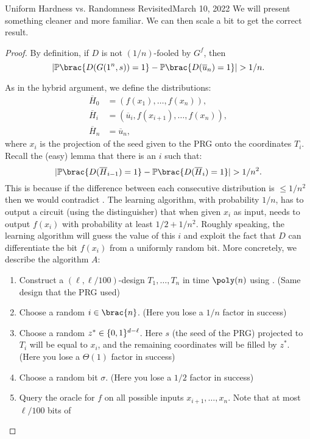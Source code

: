 \begin{lecture}{8}{Uniform Hardness vs. Randomness Revisited}{March 10, 2022}
We will present something cleaner and more familiar. We can then scale a bit to get the correct result.

\begin{proof}
	By definition, if $D$ is not $(1/n)$-fooled by $G^f$, then
	\begin{equation}\label{eq:dist-NW-prg}
		\card{\Pr\brac{D(G(1^n, s)) = 1} - \Pr\brac{D(\overline{u}_n) = 1}} > 1/n.
	\end{equation}
	
	As in the hybrid argument, we define the distributions:
	\begin{align*}
		\overline{H}_0 &= (f(x_1), \ldots, f(x_n)),\\
		\overline{H}_i &= (\overline{u}_i, f(x_{i + 1}), \ldots, f(x_n)),\\
		\overline{H}_n &= \overline{u}_n,
	\end{align*}
	where $x_i$ is the projection of the seed given to the PRG onto the
	coordinates $T_i$. Recall the (easy) lemma that there is an $i$ such that:
	\[
	\card{\Pr\brac{D(\overline{H}_{i - 1}) = 1} - \Pr\brac{D(\overline{H}_i) = 1}} > 1 / n^2.
	\]
	This is because if the difference between each consecutive distribution is $\leq 1/n^2$ then we would contradict .
	The learning algorithm, with probability $1/n$, has to output a circuit (using the distinguisher) that when given $x_i$ as input, needs to output $f(x_i)$ with probability at least $1/2 + 1/n^2$.
	Roughly speaking, the learning algorithm will guess the value of this $i$ and
	exploit the fact that $D$ can differentiate the bit $f(x_i)$ from a uniformly
	random bit. More concretely, we describe the algorithm $A$:
	\begin{enumerate}
		\item Construct a $(\ell, \ell/100)$-design $T_1, \dots, T_n$ in
		time $\poly(n)$ using . (Same design that the PRG used)
		\item Choose a random $i \in \brac{n}$. (Here you lose a $1/n$ factor in success)
		\item Choose a random $z^* \in \{0, 1\}^{d - \ell}$. Here $s$
		(the seed of the PRG) projected to $T_i$ will be equal to $x_i$,
		and the remaining coordinates will be filled by $z^*$. (Here you lose a $\Theta(1)$ factor in success)
		\item Choose a random bit $\sigma$. (Here you lose a $1/2$ factor in success)
		\item Query the oracle for $f$ on all possible inputs
		$x_{i + 1}, \ldots , x_n$. Note that at most $\ell / 100$ bits of

\end{enumerate}
\end{proof}
\end{lecture}
